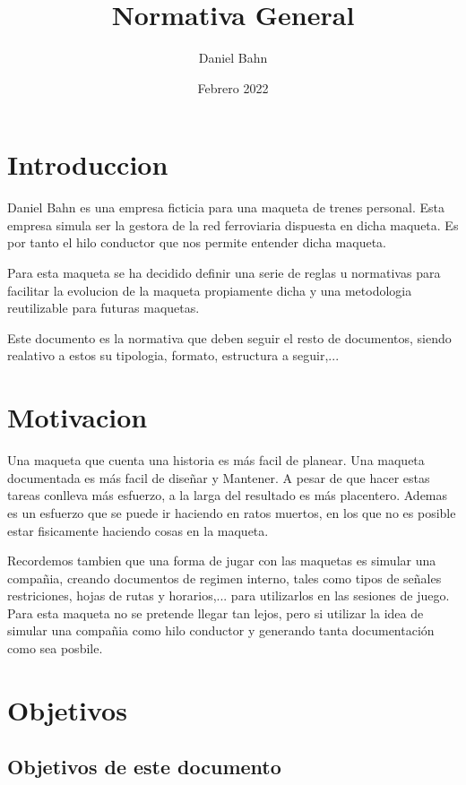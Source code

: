 \documentclass{DanielBahn}
\title{Normativa General}
\author{Daniel Bahn}
\date{Febrero 2022}
\begin{document}
\maketitle


\section{Introduccion}
Daniel Bahn es una empresa ficticia para una maqueta de trenes personal. Esta empresa simula ser la gestora de la red ferroviaria dispuesta en dicha maqueta.
Es por tanto el hilo conductor que nos permite entender dicha maqueta.

Para esta maqueta se ha decidido definir una serie de reglas u normativas para facilitar la evolucion de la maqueta propiamente dicha y una metodologia
reutilizable para futuras maquetas.

Este documento es la normativa que deben seguir el resto de documentos, siendo realativo a estos su tipologia, formato, estructura a seguir,...

\section{Motivacion}
Una maqueta que cuenta una historia es más facil de planear. Una maqueta documentada es más facil de diseñar y Mantener. A pesar de que hacer estas
tareas conlleva más esfuerzo, a la larga del resultado es más placentero. Ademas es un esfuerzo que se puede ir haciendo en ratos muertos, en los que 
no es posible estar fisicamente haciendo cosas en la maqueta.

Recordemos tambien que una forma de jugar con las maquetas es simular una compañia, creando documentos de regimen interno, tales como tipos de señales
restriciones, hojas de rutas y horarios,... para utilizarlos en las sesiones de juego. Para esta maqueta no se pretende llegar tan lejos, pero si
utilizar la idea de simular una compañia como hilo conductor y generando tanta documentación como sea posbile.

\section{Objetivos}
\subsection{Objetivos de este documento}

\end{document}
